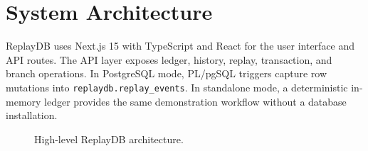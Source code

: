 \documentclass{tietreport}
\begin{document}
\section{System Architecture}
ReplayDB uses Next.js 15 with TypeScript and React for the user interface and API routes. The API layer exposes ledger, history, replay, transaction, and branch operations. In PostgreSQL mode, PL/pgSQL triggers capture row mutations into \texttt{replaydb.replay\_events}. In standalone mode, a deterministic in-memory ledger provides the same demonstration workflow without a database installation.

\begin{figure}[h]
\centering
{}
\caption{High-level ReplayDB architecture.}
\end{figure}
\end{document}
